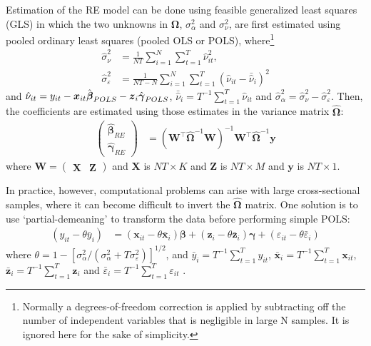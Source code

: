 \documentclass[]{interact}
\theoremstyle{plain}%
\theoremstyle{definition}
\theoremstyle{remark}
\begin{document}
Estimation of the RE model can be done using feasible generalized least
squares (GLS) in which the two unknowns in \(\bm{\Omega}\),
\(\sigma_{\alpha}^{2}\) and \(\sigma_{\nu}^{2}\), are first estimated
using pooled ordinary least squares (pooled OLS or POLS),
where\footnote{Normally a degrees-of-freedom correction is applied by
  subtracting off the number of independent variables that is negligible
  in large N samples. It is ignored here for the sake of simplicity.}
\begin{align}
\hat{\sigma}_{\nu}^{2} & = \frac{1}{NT}\sum_{i = 1}^{N}\sum_{t = 1}^{T}\hat{\nu}_{it}^{2}, \\
\hat{\sigma}_{\varepsilon}^{2} & = \frac{1}{NT - N}\sum_{i = 1}^{N}\sum_{t = 1}^{T}(\hat{\nu}_{it} - \bar{\hat{\nu}}_{i})^{2}
\end{align} and
\(\hat{\nu}_{it} = y_{it} - \bm{x}_{it}\hat{\bm{\beta}}_{\tiny{POLS}} - \bm{z}_{i}\hat{\bm{\gamma}}_{\tiny{POLS}}\),
\(\bar{\hat{\nu}}_{i} = T^{-1}\sum_{t = 1}^{T}\hat{\nu}_{it}\) and
\(\hat{\sigma}^{2}_{\alpha} = \hat{\sigma}^{2}_{\nu} - \hat{\sigma}^{2}_{\varepsilon}\).
Then, the coefficients are estimated using those estimates in the
variance matrix \(\hat{\bm{\Omega}}\): \begin{align}
\begin{pmatrix}
\hat{\bm{\beta}}_{RE} \\
\hat{\bm{\gamma}}_{RE}
\end{pmatrix} & = 
(\bm{W}^{\intercal}\hat{\bm{\Omega}}^{-1}\bm{W})^{-1}\bm{W}^{\intercal}\hat{\bm{\Omega}}^{-1}\bm{y}
\end{align} where
\(\bm{W} = \begin{pmatrix}\bm{X} & \bm{Z}\end{pmatrix}\) and \(\bm{X}\)
is \(NT \times K\) and \(\bm{Z}\) is \(NT \times M\) and \(\bm{y}\) is
\(NT \times 1\).

In practice, however, computational problems can arise with large
cross-sectional samples, where it can become difficult to invert the
\(\hat{\bm{\Omega}}\) matrix. One solution is to use `partial-demeaning'
to transform the data before performing simple POLS: \begin{align}
(y_{it} - \theta\bar{y}_{i}) & = (\bm{x}_{it} - \theta\bar{\bm{x}}_{i})\bm{\beta} + (\bm{z}_{i} - \theta \bar{\bm{z}}_{i})\bm{\gamma} + (\varepsilon_{it} - \theta \bar{\varepsilon}_{i}) \label{eq:partialdemean}
\end{align} where
\(\theta = 1 - [\sigma_{\alpha}^{2}/(\sigma_{\alpha}^{2} + T \sigma_{\varepsilon}^{2})]^{1/2}\),
and \(\bar{y}_{i} = T^{-1}\sum_{t = 1}^{T}y_{it}\),
\(\bar{\bm{x}}_{i} = T^{-1}\sum_{t = 1}^{T}\bm{x}_{it}\),
\(\bar{\bm{z}}_{i} = T^{-1}\sum_{t = 1}^{T}\bm{z}_{i}\) and
\(\bar{\varepsilon}_{i} = T^{-1}\sum_{t = 1}^{T}\varepsilon_{it}\)
\citep{R-plm_a}.
\end{document}
